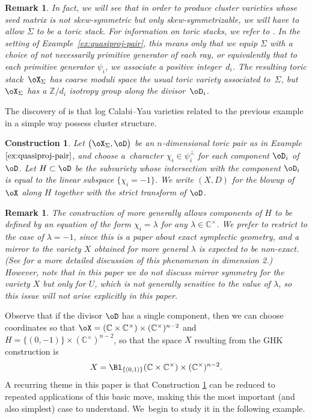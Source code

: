 \documentclass[pdftex]{sigma}%
\numberwithin{equation}{section}
\newtheorem{Construction}[Theorem]{Construction}
\newtheorem{Remark}[Theorem]{Remark} }
\def\CC{\mathbb{C}}
\def\ZZ{\mathbb{Z}}
\begin{document}
\begin{Remark}\label{rem:stackiness}
 In fact, we will see that in order to produce cluster varieties whose seed matrix is not skew-symmetric but only skew-symmetrizable, we will have to allow $\Sigma$ to be a toric stack. For information on toric stacks, we refer to \cite{BCS}. In the setting of Example~\ref{ex:quasiproj-pair}, this means only that we equip $\Sigma$ with a choice of not necessarily primitive generator of each ray, or equivalently that to each primitive generator $\psi_i$, we associate a positive integer~$d_i$. The resulting toric stack~$\oX_\Sigma$ has coarse moduli space the usual toric variety associated to~$\Sigma$, but $\oX_\Sigma$ has a $\ZZ/d_i$ isotropy group along the divisor~$\oD_i$.
\end{Remark}


The discovery of \cite{GHK2,GHK1} is that log Calabi--Yau varieties related to the previous example in a simple way possess cluster structure.
\begin{Construction}\label{constr:ghk-cluster}
 Let $\big(\oX_\Sigma,\oD\big)$ be an $n$-dimensional toric pair as in Example~$\ref{ex:quasiproj-pair}$, and choose a~character $\chi_i\in \psi_i^\perp$ for each component $\oD_i$ of $\oD$.
 Let $H\subset \oD$ be the subvariety whose intersection with the component $\oD_i$ is equal to the linear subspace $\{\chi_i = -1\}$.
 We write $(X,D)$ for the blowup of $\oX$ along $H$ together with the strict transform of $\oD$.
\end{Construction}
\begin{Remark}
 The construction of \cite{GHK2} more generally allows components of $H$ to be defined by an equation of the form $\chi_i = \lambda$ for any $\lambda\in \CC^\times$. We prefer to restrict to the case of $\lambda = -1$, since this is a paper about exact symplectic geometry, and a mirror to the variety $X$ obtained for more general $\lambda$ is expected to be non-exact. (See \cite[Section~2.2]{HK20} for a more detailed discussion of this phenomenon in dimension 2.) However, note that in this paper we do not discuss mirror symmetry for the variety $X$ but only for $U$, which is not generally sensitive to the value of $\lambda$, so this issue will not arise explicitly in this paper.
\end{Remark}

Observe that if the divisor $\oD$ has a single component, then we can choose coordinates so that $\oX = (\CC\times \CC^\times)\times(\CC^\times)^{n-2}$ and $H=\{(0,-1)\}\times (\CC^\times)^{n-2}$, so that the space $X$ resulting from the GHK construction is
\[X = \Bl_{\{(0,1)\}}(\CC\times\CC^\times)\times (\CC^\times)^{n-2}.\]
A recurring theme in this paper is that Construction \ref{constr:ghk-cluster} can be reduced to repeated applications of this basic move, making this the most important (and also simplest) case to understand. We~begin to study it in the following example.
\end{document}
